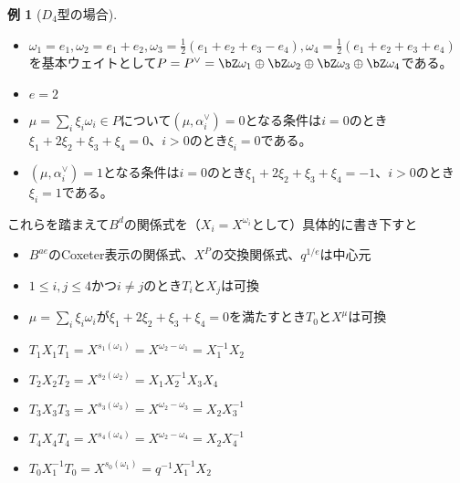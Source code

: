 \documentclass[uplatex, a4paper, dvipdfmx]{jsarticle}
\theoremstyle{definition}
\newtheorem{example}[theorem]{例}
\begin{document}
\begin{example}[$D_4$型の場合]
    \begin{itemize}
        \item $\omega_1 = e_1, \omega_2 = e_1 + e_2, \omega_3 = \frac{1}{2}(e_1 + e_2 + e_3 - e_4), \omega_4 = \frac{1}{2}(e_1 + e_2 + e_3 + e_4)$を基本ウェイトとして$P = P^\vee = \bZ \omega_1 \oplus \bZ \omega_2 \oplus \bZ \omega_3 \oplus \bZ \omega_4$である。
        \item $e = 2$
        \item $\mu = \sum_i \xi_i \omega_i \in P$について$(\mu, \alpha_i^\vee) = 0$となる条件は$i=0$のとき$\xi_1 + 2\xi_2 + \xi_3 + \xi_4 = 0$、$i > 0$のとき$\xi_i = 0$である。
        \item $(\mu, \alpha_i^\vee) = 1$となる条件は$i=0$のとき$\xi_1 + 2\xi_2 + \xi_3 + \xi_4 = -1$、$i > 0$のとき$\xi_i = 1$である。
    \end{itemize}
    これらを踏まえて$B^d$の関係式を（$X_i = X^{\omega_i}$として）具体的に書き下すと
    \begin{itemize}
        \item $B^{ae}$のCoxeter表示の関係式、$X^P$の交換関係式、$q^{1/e}$は中心元
        \item $1\leq i, j \leq 4$かつ$i \neq j$のとき$T_i$と$X_j$は可換
        \item $\mu = \sum_i \xi_i \omega_i$が$\xi_1 + 2\xi_2 + \xi_3 + \xi_4 = 0$を満たすとき$T_0$と$X^\mu$は可換
        \item $T_1X_1T_1 = X^{s_1(\omega_1)} = X^{\omega_2-\omega_1} = X_1^{-1}X_2$
        \item $T_2X_2T_2 = X^{s_2(\omega_2)} = X_1X_2^{-1}X_3X_4$
        \item $T_3X_3T_3 = X^{s_3(\omega_3)} = X^{\omega_2-\omega_3} = X_2X_3^{-1}$
        \item $T_4X_4T_4 = X^{s_4(\omega_4)} = X^{\omega_2-\omega_4} = X_2X_4^{-1}$
        \item $T_0X_1^{-1}T_0 = X^{s_0(\omega_1)} = q^{-1}X_1^{-1}X_2$
    \end{itemize}
\end{example}
\end{document}
